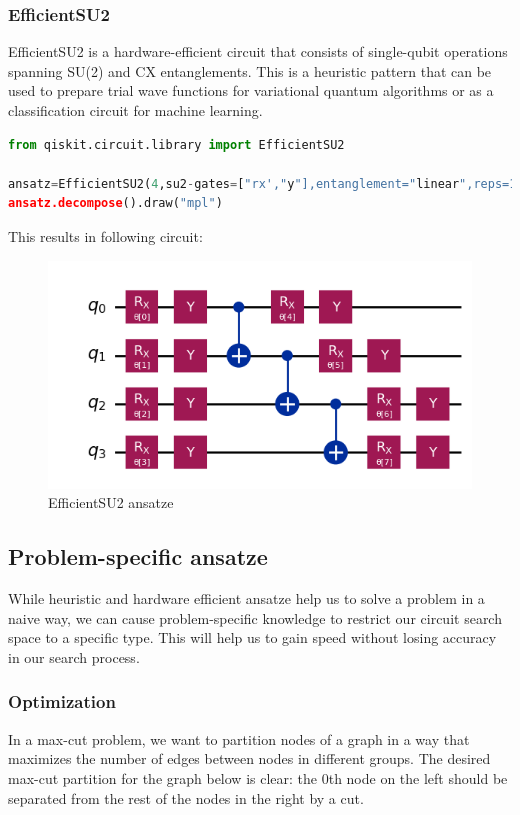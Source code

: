 \documentclass[12pt, oneside]{book}
\theoremstyle{definition}
\theoremstyle{definition}
\theoremstyle{remark}
\begin{document}
\subsubsection{EfficientSU2}
EfficientSU2 is a hardware-efficient circuit that consists of single-qubit operations spanning SU(2) and CX entanglements. This is a heuristic pattern that can be used to prepare trial wave functions for variational quantum algorithms or as a classification circuit for machine learning.
\begin{lstlisting}[language=Python]
from qiskit.circuit.library import EfficientSU2

ansatz=EfficientSU2(4,su2-gates=["rx',"y"],entanglement="linear",reps=1)
ansatz.decompose().draw("mpl")
\end{lstlisting}
This results in following circuit:
\begin{figure}[H]
    \centering
    \includegraphics[width=0.5\linewidth]{../images/efficientsu2_ansatz.png}
    \caption{EfficientSU2 ansatze}
    \label{fig:efficeintsu2}
\end{figure}
\subsection{Problem-specific ansatze}
While heuristic and hardware efficient ansatze help us to solve a problem in a naive way, we can cause problem-specific knowledge to restrict our circuit search space to a specific type. This will help us to gain speed without losing accuracy in our search process.

\subsubsection{Optimization}
In a max-cut problem, we want to partition nodes of a graph in a way that maximizes the number of edges between nodes in different groups. The desired max-cut partition for the graph below is clear: the 0th node on the left should be separated from the rest of the nodes in the right by a cut.
\end{document}

